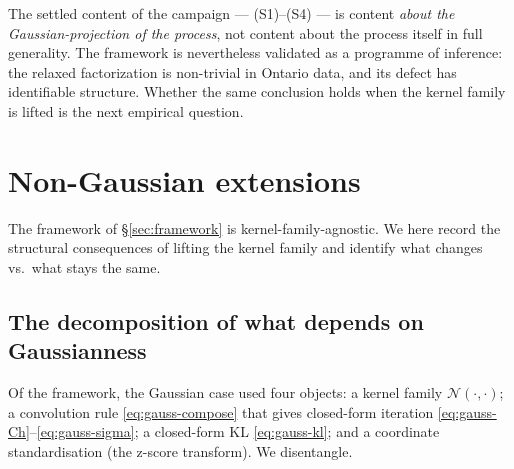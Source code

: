 \documentclass[11pt]{article}
\newcommand{\Nrm}{\mathcal{N}}
\theoremstyle{definition}
\theoremstyle{plain}
\begin{document}
The settled content of the campaign --- (S1)--(S4) --- is content
\emph{about the Gaussian-projection of the process}, not content
about the process itself in full generality. The framework is
nevertheless validated as a programme of inference: the relaxed
factorization is non-trivial in Ontario data, and its defect has
identifiable structure. Whether the same conclusion holds when
the kernel family is lifted is the next empirical question.

\section{Non-Gaussian extensions}
\label{sec:nongaussian}

The framework of \S\ref{sec:framework} is kernel-family-agnostic.
We here record the structural consequences of lifting the kernel
family and identify what changes vs.\ what stays the same.

\subsection{The decomposition of what depends on Gaussianness}

Of the framework, the Gaussian case used four objects: a kernel
family $\Nrm(\cdot, \cdot)$; a convolution rule \eqref{eq:gauss-compose}
that gives closed-form iteration \eqref{eq:gauss-Ch}--\eqref{eq:gauss-sigma};
a closed-form KL \eqref{eq:gauss-kl}; and a coordinate
standardisation (the z-score transform). We disentangle.
\end{document}
